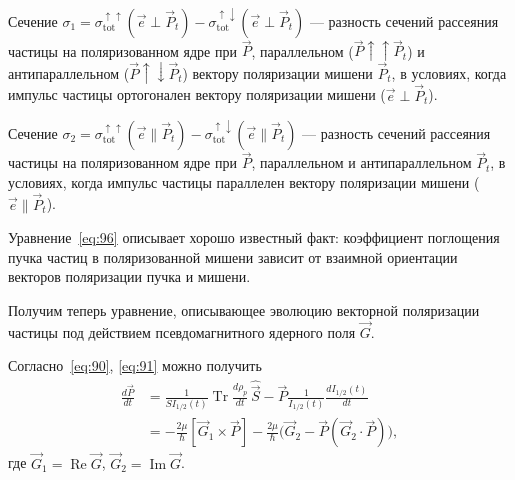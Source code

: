 \documentclass[11pt,a4paper]{article}
\DeclareMathOperator{\Tr}{Tr}
\DeclareMathOperator{\Reop}{Re}
\DeclareMathOperator{\Imop}{Im}
\newcommand{\hvec}[1]{\hat{\vec{#1}}}
\begin{document}
Сечение $\sigma_1=\sigma_{\mathrm{tot}}^{\uparrow\uparrow}(\vec{e}\perp\vec{P}_t)
-\sigma_{\mathrm{tot}}^{\uparrow\downarrow}(\vec{e}\perp\vec{P}_t)$ ---
разность сечений рассеяния частицы на поляризованном ядре при $\vec{P}$,
параллельном ($\vec{P}\uparrow\uparrow\vec{P}_t$) и антипараллельном
($\vec{P}\uparrow\downarrow\vec{P}_t$) вектору поляризации мишени
$\vec{P}_t$, в условиях, когда импульс частицы ортогонален вектору
поляризации мишени ($\vec{e}\perp\vec{P}_t$).

Сечение $\sigma_2=\sigma_{\mathrm{tot}}^{\uparrow\uparrow}(\vec{e}\parallel\vec{P}_t)
-\sigma_{\mathrm{tot}}^{\uparrow\downarrow}(\vec{e}\parallel\vec{P}_t)$ ---
разность сечений рассеяния частицы на поляризованном ядре при $\vec{P}$,
параллельном и антипараллельном $\vec{P}_t$, в условиях, когда импульс
частицы параллелен вектору поляризации мишени ($\vec{e}\parallel\vec{P}_t$).

Уравнение~\eqref{eq:96} описывает хорошо известный факт: коэффициент
поглощения пучка частиц в поляризованной мишени зависит от взаимной
ориентации векторов поляризации пучка и мишени.

Получим теперь уравнение, описывающее эволюцию векторной поляризации
частицы под действием псевдомагнитного ядерного поля $\vec{G}$.

Согласно~\eqref{eq:90}, \eqref{eq:91} можно получить
\begin{equation}
\begin{aligned}
\frac{d\vec{P}}{dt}
&=\frac{1}{S I_{1/2}(t)}\Tr\frac{d\rho_p}{dt}\,\hvec{S}
-\vec{P}\frac{1}{I_{1/2}(t)}\frac{d I_{1/2}(t)}{dt}\\
&=-\frac{2\mu}{\hbar}[\vec{G}_1\times\vec{P}]
-\frac{2\mu}{\hbar}\bigl(\vec{G}_2-\vec{P}(\vec{G}_2\cdot\vec{P})\bigr),
\end{aligned}
\label{eq:97}
\end{equation}
где $\vec{G}_1=\Reop\vec{G}$, $\vec{G}_2=\Imop\vec{G}$.
\end{document}
